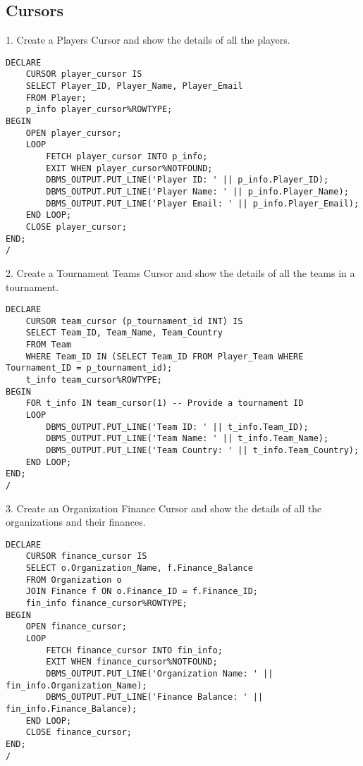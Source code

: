 \clearpage
\subsection{Cursors}
\hrulefill

1. Create a Players Cursor and show the details of all the players.

\begin{lstlisting}[caption={ Query 1},label={lst:q-1}]
    DECLARE
    CURSOR player_cursor IS
    SELECT Player_ID, Player_Name, Player_Email
    FROM Player;
    p_info player_cursor%ROWTYPE;
BEGIN
    OPEN player_cursor;
    LOOP
        FETCH player_cursor INTO p_info;
        EXIT WHEN player_cursor%NOTFOUND;
        DBMS_OUTPUT.PUT_LINE('Player ID: ' || p_info.Player_ID);
        DBMS_OUTPUT.PUT_LINE('Player Name: ' || p_info.Player_Name);
        DBMS_OUTPUT.PUT_LINE('Player Email: ' || p_info.Player_Email);
    END LOOP;
    CLOSE player_cursor;
END;
/

\end{lstlisting}

2. Create a Tournament Teams Cursor and show the details of all the teams in a tournament.

\begin{lstlisting}[caption={ Query 2},label={lst:q-2}]
    DECLARE
    CURSOR team_cursor (p_tournament_id INT) IS
    SELECT Team_ID, Team_Name, Team_Country
    FROM Team
    WHERE Team_ID IN (SELECT Team_ID FROM Player_Team WHERE Tournament_ID = p_tournament_id);
    t_info team_cursor%ROWTYPE;
BEGIN
    FOR t_info IN team_cursor(1) -- Provide a tournament ID
    LOOP
        DBMS_OUTPUT.PUT_LINE('Team ID: ' || t_info.Team_ID);
        DBMS_OUTPUT.PUT_LINE('Team Name: ' || t_info.Team_Name);
        DBMS_OUTPUT.PUT_LINE('Team Country: ' || t_info.Team_Country);
    END LOOP;
END;
/
\end{lstlisting}

3. Create an Organization Finance Cursor and show the details of all the organizations and their finances.

\begin{lstlisting}[caption={ Query 3},label={lst:q-3}]
    DECLARE
    CURSOR finance_cursor IS
    SELECT o.Organization_Name, f.Finance_Balance
    FROM Organization o
    JOIN Finance f ON o.Finance_ID = f.Finance_ID;
    fin_info finance_cursor%ROWTYPE;
BEGIN
    OPEN finance_cursor;
    LOOP
        FETCH finance_cursor INTO fin_info;
        EXIT WHEN finance_cursor%NOTFOUND;
        DBMS_OUTPUT.PUT_LINE('Organization Name: ' || fin_info.Organization_Name);
        DBMS_OUTPUT.PUT_LINE('Finance Balance: ' || fin_info.Finance_Balance);
    END LOOP;
    CLOSE finance_cursor;
END;
/
\end{lstlisting}